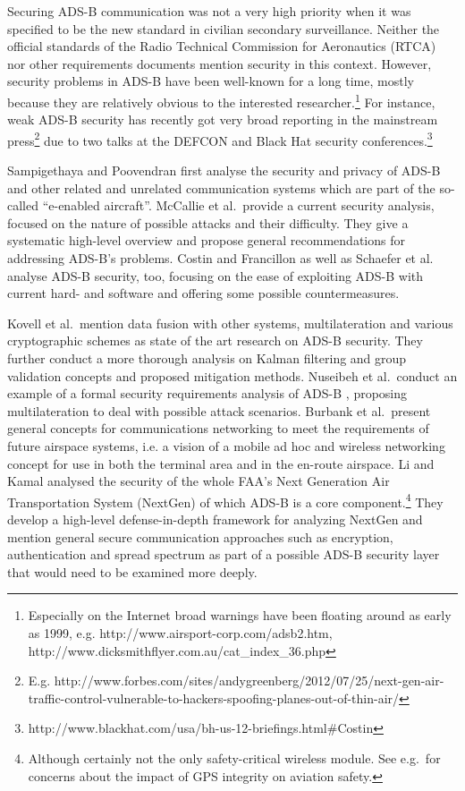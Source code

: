 \documentclass[english]{IEEEtran}
\begin{document}
Securing ADS-B communication was not a very high priority when it
was specified to be the new standard in civilian secondary surveillance.
Neither the official standards of the Radio Technical Commission for
Aeronautics (RTCA) \cite{DO2422,DO260B,DO282B2} nor other requirements
documents \cite{Martone2001a,Rekkas2008} mention security in this
context. However, security problems in ADS-B have been well-known
for a long time, mostly because they are relatively obvious to the
interested researcher.\footnote{Especially on the Internet broad warnings have been floating around
as early as 1999, e.g. http://www.airsport-corp.com/adsb2.htm, http://www.dicksmithflyer.com.au/cat\_index\_36.php} For instance, weak ADS-B security has recently got very broad reporting
in the mainstream press\footnote{E.g. http://www.forbes.com/sites/andygreenberg/2012/07/25/next-gen-air-traffic-control-vulnerable-to-hackers-spoofing-planes-out-of-thin-air/} due to two talks at the DEFCON and Black Hat security conferences.\footnote{http://www.blackhat.com/usa/bh-us-12-briefings.html\#Costin} 

Sampigethaya and Poovendran \cite{Sampigethaya2011,Sampigethaya}
first analyse the security and privacy of ADS-B and other related
and unrelated communication systems which are part of the so-called
``e-enabled aircraft''. McCallie et al.\,\cite{McCallie2011} provide
a current security analysis, focused on the nature of possible attacks
and their difficulty. They give a systematic high-level overview and
propose general recommendations for addressing ADS-B's problems. Costin
and Francillon \cite{Costin} as well as Schaefer et al.\,\cite{schafer2013experimental}
analyse ADS-B security, too, focusing on the ease of exploiting ADS-B
with current hard- and software and offering some possible countermeasures. 

Kovell et al.\,\cite{Kovell2012} mention data fusion with other
systems, multilateration and various cryptographic schemes as state
of the art research on ADS-B security. They further conduct a more
thorough analysis on Kalman filtering and group validation concepts
and proposed mitigation methods. Nuseibeh et al.~conduct an example
of a formal security requirements analysis of ADS-B \cite{Nuseibeh2009},
proposing multilateration to deal with possible attack scenarios.
Burbank et al.\,\cite{Burbank2005} present general concepts for
communications networking to meet the requirements of future airspace
systems, i.e. a vision of a mobile ad hoc and wireless networking
concept for use in both the terminal area and in the en-route airspace.
Li and Kamal \cite{Li2011} analysed the security of the whole FAA's
Next Generation Air Transportation System (NextGen) of which ADS-B
is a core component.\footnote{Although certainly not the only safety-critical wireless module. See
e.g.\,\cite{Ochieng2003} for concerns about the impact of GPS integrity
on aviation safety. } They develop a high-level defense-in-depth framework for analyzing
NextGen and mention general secure communication approaches such as
encryption, authentication and spread spectrum as part of a possible
ADS-B security layer that would need to be examined more deeply.
\end{document}
